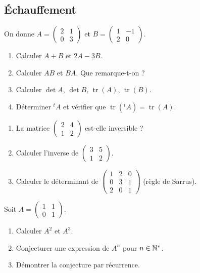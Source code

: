 \subsection{Échauffement}

On donne $A = \begin{pmatrix}2&1\\0&3\end{pmatrix}$ et
$B = \begin{pmatrix}1&-1\\2&0\end{pmatrix}$.
\begin{enumerate}
	\item Calculer $A + B$ et $2A - 3B$.
	\item Calculer $AB$ et $BA$. Que remarque-t-on ?
	\item Calculer $\det A$, $\det B$, $\operatorname{tr}(A)$, $\operatorname{tr}(B)$.
	\item Déterminer ${}^{t}\!A$ et vérifier que $\operatorname{tr}({}^{t}\!A) = \operatorname{tr}(A)$.
\end{enumerate}

\begin{enumerate}
	\item La matrice $\begin{pmatrix}2&4\\1&2\end{pmatrix}$ est-elle inversible ?
	\item Calculer l'inverse de $\begin{pmatrix}3&5\\1&2\end{pmatrix}$.
	\item Calculer le déterminant de
	$\begin{pmatrix}1&2&0\\0&3&1\\2&0&1\end{pmatrix}$ (règle de Sarrus).
\end{enumerate}

Soit $A = \begin{pmatrix}1&1\\0&1\end{pmatrix}$.
\begin{enumerate}
	\item Calculer $A^2$ et $A^3$.
	\item Conjecturer une expression de $A^n$ pour $n \in \mathbb{N}^*$.
	\item Démontrer la conjecture par récurrence.
\end{enumerate}

